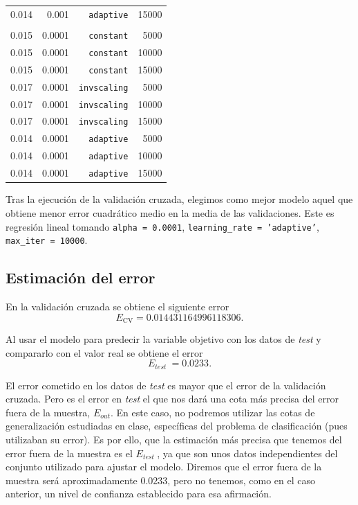 \documentclass[a4paper, 20pt]{article}
\newcommand{\test}{\textit{test }}
\begin{document}
{\begin{table}[H]
\begin{tabular}{lrrr}
0.014 & 0.001 &\texttt{adaptive} & 15000\\\\[-10pt]
0.015 & 0.0001 &\texttt{constant} & 5000\\
0.015 & 0.0001 &\texttt{constant} & 10000\\
0.015 & 0.0001 &\texttt{constant} & 15000\\
0.017 & 0.0001 &\texttt{invscaling} & 5000\\
0.017 & 0.0001 &\texttt{invscaling} & 10000\\
0.017 & 0.0001 &\texttt{invscaling} & 15000\\
0.014 & 0.0001 &\texttt{adaptive} & 5000\\
0.014 & 0.0001 &\texttt{adaptive} & 10000\\
0.014 & 0.0001 &\texttt{adaptive} & 15000\\
\bottomrule
\end{tabular}
\end{table}

Tras la ejecución de la validación cruzada, elegimos como mejor modelo aquel que obtiene menor error cuadrático medio en la media de las validaciones. Este es regresión lineal tomando \texttt{alpha = 0.0001}, \texttt{learning\_rate = 'adaptive'}, \texttt{max\_iter = 10000}.

\subsection{Estimación del error}
En la validación cruzada se obtiene el siguiente error\[
E_{\text{CV}} = 0.014431164996118306.\]

Al usar el modelo para predecir la variable objetivo con los datos de \test y compararlo con el valor real se obtiene el error\[
E_{\test} = 0.0233.
\]

El error cometido en los datos de \test es mayor que el error de la validación cruzada. Pero es el error en \test el que nos dará una cota más precisa del error fuera de la muestra, $E_{\textit{out}}$. En este caso, no podremos utilizar las cotas de generalización estudiadas en clase, específicas del problema de clasificación (pues utilizaban su error). Es por ello, que la estimación más precisa que tenemos del error fuera de la muestra es el $E_{\test}$, ya que son unos datos independientes del conjunto utilizado para ajustar el modelo. Diremos que el error fuera de la muestra será aproximadamente 0.0233, pero no tenemos, como en el caso anterior, un nivel de confianza establecido para esa afirmación.

}
\end{document}
